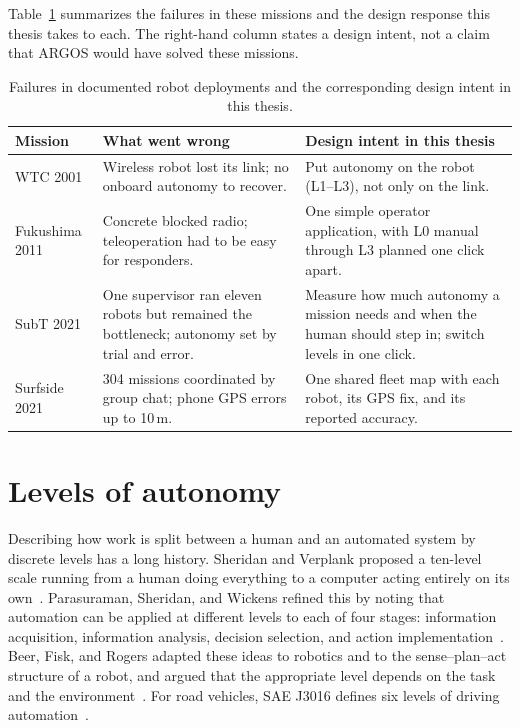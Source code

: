 Table~\ref{tab:bg-lessons} summarizes the failures in these missions and the design response this thesis takes to each.
The right-hand column states a design intent, not a claim that ARGOS would have solved these missions.

\begin{table}[ht]
\centering
\caption{Failures in documented robot deployments and the corresponding design intent in this thesis.}
\label{tab:bg-lessons}
\small
\begin{tabularx}{\textwidth}{@{}l X X@{}}
\toprule
Mission & What went wrong & Design intent in this thesis \\
\midrule
WTC 2001 & Wireless robot lost its link; no onboard autonomy to recover. & Put autonomy on the robot (L1--L3), not only on the link. \\
Fukushima 2011 & Concrete blocked radio; teleoperation had to be easy for responders. & One simple operator application, with L0 manual through L3 planned one click apart. \\
SubT 2021 & One supervisor ran eleven robots but remained the bottleneck; autonomy set by trial and error. & Measure how much autonomy a mission needs and when the human should step in; switch levels in one click. \\
Surfside 2021 & 304 missions coordinated by group chat; phone GPS errors up to 10\,m. & One shared fleet map with each robot, its GPS fix, and its reported accuracy. \\
\bottomrule
\end{tabularx}
\end{table}

\section{Levels of autonomy}
\label{sec:bg-levels}

Describing how work is split between a human and an automated system by discrete levels has a long history.
Sheridan and Verplank proposed a ten-level scale running from a human doing everything to a computer acting entirely on its own~\citep{sheridan1978verplank}.
Parasuraman, Sheridan, and Wickens refined this by noting that automation can be applied at different levels to each of four stages: information acquisition, information analysis, decision selection, and action implementation~\citep{parasuraman2000levels}.
Beer, Fisk, and Rogers adapted these ideas to robotics and to the sense--plan--act structure of a robot, and argued that the appropriate level depends on the task and the environment~\citep{beer2014lora}.
For road vehicles, SAE J3016 defines six levels of driving automation~\citep{sae2021j3016}.

